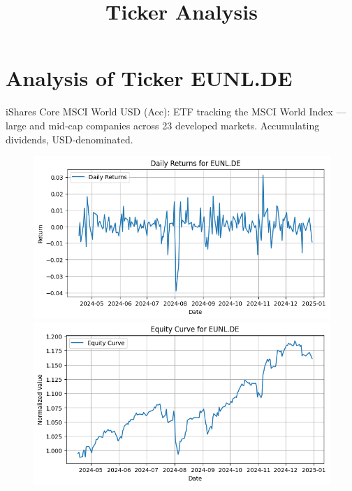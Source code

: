 \documentclass{article}%
\title{Ticker Analysis}%
\author{}%
\date{}%
\begin{document}
%
\normalsize%
\maketitle%
\section*{Analysis of Ticker EUNL.DE}%
\label{sec:AnalysisofTickerEUNL.DE}%
iShares Core MSCI World USD (Acc): ETF tracking the MSCI World Index — large and mid‑cap companies across 23 developed markets. Accumulating dividends, USD‑denominated.%


\begin{figure}[htbp]%
\begin{minipage}{0.31\textwidth}%
\includegraphics[width=\linewidth]{ticker_images/EUNL.DE_daily_returns.png}%
\end{minipage}%
\begin{minipage}{0.31\textwidth}%
\includegraphics[width=\linewidth]{ticker_images/EUNL.DE_equity_curve.png}%
\end{minipage}%
\begin{minipage}{0.31\textwidth}%

\end{minipage}
\end{figure}
\end{document}
